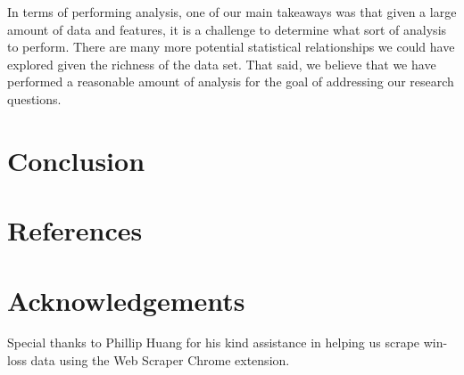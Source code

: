 \documentclass[paper=a4, fontsize=11pt]{scrartcl} %
\numberwithin{equation}{section} %
\numberwithin{figure}{section} %
\numberwithin{table}{section} %
\begin{document}
\hspace*{1cm}In terms of performing analysis, one of our main takeaways was that given a large amount of data and features, it is a challenge to determine what sort of analysis to perform. There are many more potential statistical relationships we could have explored given the richness of the data set. That said, we believe that we have performed a reasonable amount of analysis for the goal of addressing our research questions.
\section{Conclusion}
\section{References}
\section{Acknowledgements}
\hspace*{1cm}Special thanks to Phillip Huang for his kind assistance in helping us scrape win-loss data using the Web Scraper Chrome extension.
\end{document}
